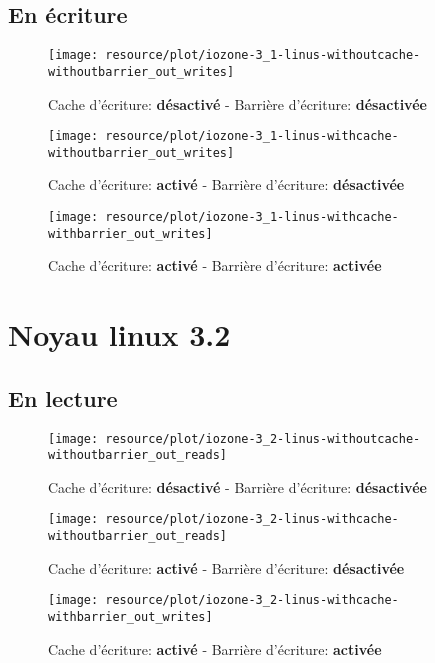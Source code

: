 \subsection*{En écriture}

\begin{figure}[H]
	\centering
	\texttt{[image: resource/plot/iozone-3\_1-linus-withoutcache-withoutbarrier\_out\_writes]}
	\caption{Cache d'écriture: \textbf{désactivé}   -   Barrière d'écriture: \textbf{désactivée}}
\end{figure}

\begin{figure}[H]
	\centering
	\texttt{[image: resource/plot/iozone-3\_1-linus-withcache-withoutbarrier\_out\_writes]}
	\caption{Cache d'écriture: \textbf{activé}   -   Barrière d'écriture: \textbf{désactivée}}
\end{figure}

\begin{figure}[H]
	\centering
	\texttt{[image: resource/plot/iozone-3\_1-linus-withcache-withbarrier\_out\_writes]}
	\caption{Cache d'écriture: \textbf{activé}   -   Barrière d'écriture: \textbf{activée}}
\end{figure}

\section{Noyau linux 3.2}

\subsection*{En lecture}

\begin{figure}[H]
	\centering
	\texttt{[image: resource/plot/iozone-3\_2-linus-withoutcache-withoutbarrier\_out\_reads]}
	\caption{Cache d'écriture: \textbf{désactivé}   -   Barrière d'écriture: \textbf{désactivée}}
\end{figure}

\begin{figure}[H]
	\centering
	\texttt{[image: resource/plot/iozone-3\_2-linus-withcache-withoutbarrier\_out\_reads]}
	\caption{Cache d'écriture: \textbf{activé}   -   Barrière d'écriture: \textbf{désactivée}}
\end{figure}

\begin{figure}[H]
	\centering
	\texttt{[image: resource/plot/iozone-3\_2-linus-withcache-withbarrier\_out\_writes]}
	\caption{Cache d'écriture: \textbf{activé}   -   Barrière d'écriture: \textbf{activée}}
\end{figure}

